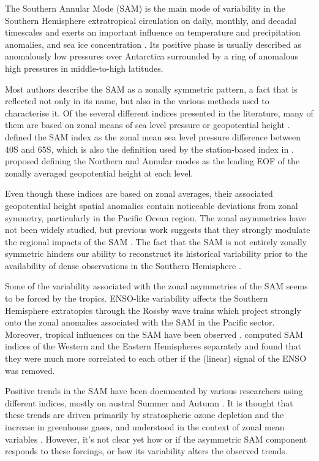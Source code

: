\documentclass[smallextended]{svjour3}       %
\begin{document}
The Southern Annular Mode (SAM) is the main mode of variability in the Southern Hemisphere extratropical circulation \citep{rogers1982} on daily, monthly, and decadal timescales \citep{baldwin2001a, fogt2006} and exerts an important influence on temperature and precipitation anomalies, and sea ice concentration \citep[e.g.][]{fogt2020}.
Its positive phase is usually described as anomalously low pressures over Antarctica surrounded by a ring of anomalous high pressures in middle-to-high latitudes.

Most authors describe the SAM as a zonally symmetric pattern, a fact that is reflected not only in its name, but also in the various methods used to characterise it.
Of the several different indices presented in the literature, many of them are based on zonal means of sea level pressure or geopotential height \citep{ho2012}.
\citet{gong1999} defined the SAM index as the zonal mean sea level pressure difference between 40\degree S and 65\degree S, which is also the definition used by the station-based index in \citet{marshall2003}.
\citet{baldwin2009} proposed defining the Northern and Annular modes as the leading EOF of the zonally averaged geopotential height at each level.

Even though these indices are based on zonal averages, their associated geopotential height spatial anomalies contain noticeable deviations from zonal symmetry, particularly in the Pacific Ocean region.
The zonal asymmetries have not been widely studied, but previous work suggests that they strongly modulate the regional impacts of the SAM \citep{fan2007, silvestri2009, fogt2012, rosso2018}.
The fact that the SAM is not entirely zonally symmetric hinders our ability to reconstruct its historical variability prior to the availability of dense observations in the Southern Hemisphere \citep{jones2009}.

Some of the variability associated with the zonal asymmetries of the SAM seems to be forced by the tropics.
ENSO-like variability affects the Southern Hemisphere extratopics through the Rossby wave trains \citep{mo1987, kidson1988, karoly1989} which project strongly onto the zonal anomalies associated with the SAM in the Pacific sector.
Moreover, tropical influences on the SAM have been observed \citep{fan2007, fogt2011, clem2013}.
\citet{fan2007} computed SAM indices of the Western and the Eastern Hemispheres separately and found that they were much more correlated to each other if the (linear) signal of the ENSO was removed.

Positive trends in the SAM have been documented by various researchers using different indices, mostly on austral Summer and Autumn \citep[e.g.][ and references therein]{fogt2020}.
It is thought that these trends are driven primarily by stratospheric ozone depletion and the increase in greenhouse gases, and understood in the context of zonal mean variables \citep{marshall2004, gillett2005, arblaster2006, gillett2013}.
However, it's not clear yet how or if the asymmetric SAM component responds to these forcings, or how its variability alters the observed trends.
\end{document}
